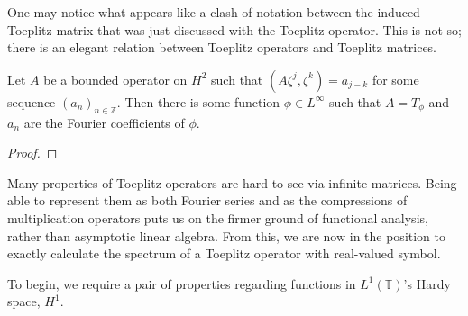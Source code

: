 \documentclass[../main.tex]{subfiles}
\begin{document}
One may notice what appears like a clash of notation between the induced Toeplitz matrix that was just discussed with the Toeplitz operator. This is not
so; there is an elegant relation between Toeplitz operators and Toeplitz matrices.

\begin{theorem}
Let $A$ be a bounded operator on $H^2$ such that $(A \zeta^j, \zeta^k) = a_{j-k}$ for some sequence $(a_n)_{n \in \mathbb{Z}}$. Then there is
some function $\phi \in L^\infty$ such that $A = T_\phi$ and $a_n$ are the Fourier coefficients of $\phi$.
\end{theorem}
\begin{proof}
\end{proof}

Many properties of Toeplitz operators are hard to see via infinite matrices. Being able to represent them as both Fourier series and as the  
compressions of multiplication operators puts us on the firmer ground of functional analysis, rather than asymptotic linear algebra. From this, we
are now in the position to exactly calculate the spectrum of a Toeplitz operator with real-valued symbol.

To begin, we require a pair of properties regarding functions in $L^1(\mathbb{T})$'s Hardy space, $H^1$. 
\end{document}
